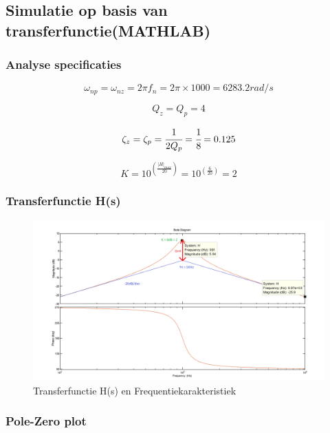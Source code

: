 \documentclass[]{article}
\begin{document}
\subsection*{Simulatie op basis van transferfunctie(MATHLAB)}

\subsubsection*{Analyse specificaties}

\begin{equation*}
\omega_{np} = \omega_{nz} = 2\pi f_{n} = 2\pi\times1000 = 6283.2rad/s
\end{equation*}

\begin{equation*}
	Q_{z} = Q_{p} = 4
\end{equation*}

\begin{equation*}
\zeta_{z} = \zeta_{p} = \cfrac{1}{2Q_{p}} = \cfrac{1}{8} = 0.125
\end{equation*}

\begin{equation*}
K = 10^{(\frac{|H|_{max}}{20})} = 10^{(\frac{6}{20})} = 2
\end{equation*}

\subsubsection*{Transferfunctie H(s)}

\begin{figure}[h]
\centering
\includegraphics[width=13cm]{bode+freq}
\caption{Transferfunctie H(s) en Frequentiekarakteristiek}
\label{fig:bode+freq}
\end{figure}

\subsubsection*{Pole-Zero plot}
\end{document}
